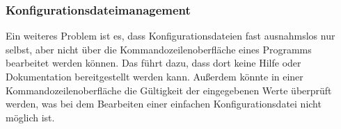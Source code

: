 \subsubsection{Konfigurationsdateimanagement}
Ein weiteres Problem ist es, dass Konfigurationsdateien fast ausnahmslos nur selbst, aber nicht über die
Kommandozeilenoberfläche eines Programms bearbeitet werden können.
Das führt dazu, dass dort keine Hilfe oder Dokumentation bereitgestellt werden kann.
Au\ss erdem könnte in einer Kommandozeilenoberfläche die Gültigkeit der eingegebenen Werte
überprüft werden, was bei dem Bearbeiten einer einfachen Konfigurationsdatei nicht möglich ist.